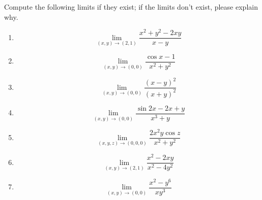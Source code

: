 \documentclass[openany]{book}
\begin{document}
\begin{prob}
    Compute the following limits if they exist; if the limits don't exist, please explain why.
    \begin{enumerate}
        \item \begin{equation*}
            \lim_{(x,y)\to(2,1)}\frac{x^2+y^2-2xy}{x-y}
        \end{equation*}
        \item \begin{equation*}
            \lim_{(x,y)\to(0,0)}\frac{\cos x-1}{x^2+y^2}
        \end{equation*}
        \item \begin{equation*}
            \lim_{(x,y)\to (0,0)}\frac{(x-y)^2}{(x+y)^2}
        \end{equation*}
        \item \begin{equation*}
            \lim_{(x,y)\to(0,0)}\frac{\sin 2x-2x+y}{x^3+y}
        \end{equation*}
        \item \begin{equation*}
            \lim_{(x,y,z)\to(0,0,0)}\frac{2x^2y\cos z}{x^2+y^2}
        \end{equation*}
        \item \begin{equation*}
            \lim_{(x,y)\to(2,1)}\frac{x^2-2xy}{x^2-4y^2}
        \end{equation*}
        \item \begin{equation*}
            \lim_{(x,y)\to(0,0)}\frac{x^2-y^6}{xy^3}
        \end{equation*}
    \end{enumerate}
\end{prob}
\end{document}
